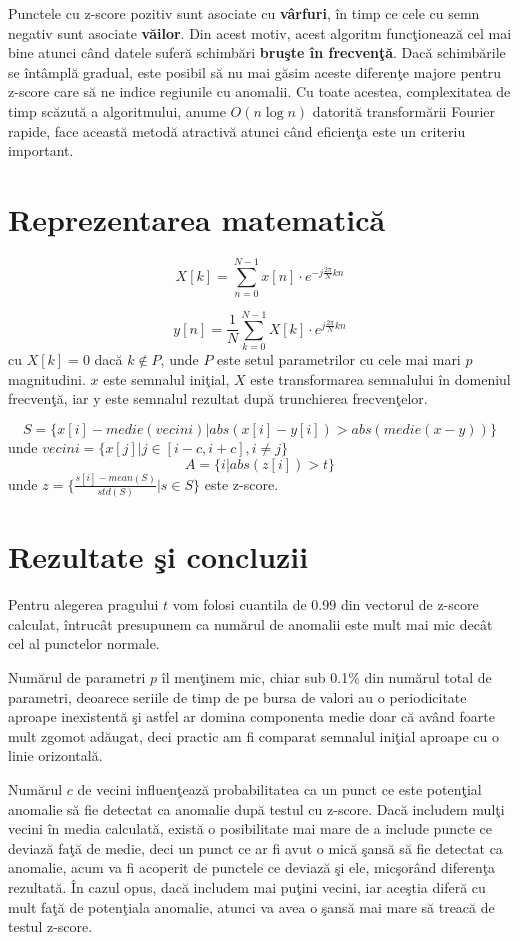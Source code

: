 Punctele cu z-score pozitiv sunt asociate cu \textbf{vârfuri}, în timp ce cele cu semn negativ sunt asociate \textbf{văilor}. Din acest motiv,
acest algoritm funcţionează cel mai bine atunci când datele suferă schimbări \textbf{bruşte în frecvenţă}. Dacă schimbările se întâmplă gradual,
este posibil să nu mai găsim aceste diferenţe majore pentru z-score care să ne indice regiunile cu anomalii. Cu toate acestea, complexitatea 
de timp scăzută a algoritmului, anume $O(n \log n)$ datorită transformării Fourier rapide, face această metodă atractivă atunci când 
eficienţa este un criteriu important.

\section{Reprezentarea matematică}

\[ X[k] = \sum_{n=0}^{N-1} x[n] \cdot e^{-j\frac{2\pi}{N}kn} \]

\[ y[n] = \frac{1}{N} \sum_{k=0}^{N-1} X[k] \cdot e^{j\frac{2\pi}{N}kn} \] cu $X[k]=0$ dacă $k \notin P$, unde $P$ este setul parametrilor
cu cele mai mari $p$ magnitudini. $x$ este semnalul iniţial, $X$ este transformarea semnalului în domeniul frecvenţă, iar y este 
semnalul rezultat după trunchierea frecvenţelor.

\[ S = \{ x[i] - medie(vecini) | abs(x[i] - y[i]) > abs(medie(x - y))\} \] unde $vecini = \{x[j] | j \in [i - c, i + c], i \neq j \}$
\[ A = \{ i | abs(z[i]) > t \}\] unde $z = \{\frac{s[i] - mean(S)}{std(S)} | s \in S\}$ este z-score.

\section{Rezultate şi concluzii}

Pentru alegerea pragului $t$ vom folosi cuantila de 0.99 din vectorul de z-score calculat, întrucât presupunem ca numărul de 
anomalii este mult mai mic decât cel al punctelor normale.

Numărul de parametri $p$ îl menţinem mic, chiar sub 0.1\% din numărul total de parametri, deoarece seriile de timp de pe bursa 
de valori au o periodicitate aproape inexistentă şi astfel ar domina componenta medie doar că având foarte mult zgomot adăugat, 
deci practic am fi comparat semnalul iniţial aproape cu o linie orizontală.

Numărul $c$ de vecini influenţează probabilitatea ca un punct ce este potenţial anomalie să fie detectat ca anomalie după testul cu z-score.
Dacă includem mulţi vecini în media calculată, există o posibilitate mai mare de a include puncte ce deviază faţă de medie, deci un punct
ce ar fi avut o mică şansă să fie detectat ca anomalie, acum va fi acoperit de punctele ce deviază şi ele, micşorând diferenţa rezultată.
În cazul opus, dacă includem mai puţini vecini, iar aceştia diferă cu mult faţă de potenţiala anomalie, atunci va avea o şansă mai mare 
să treacă de testul z-score.

